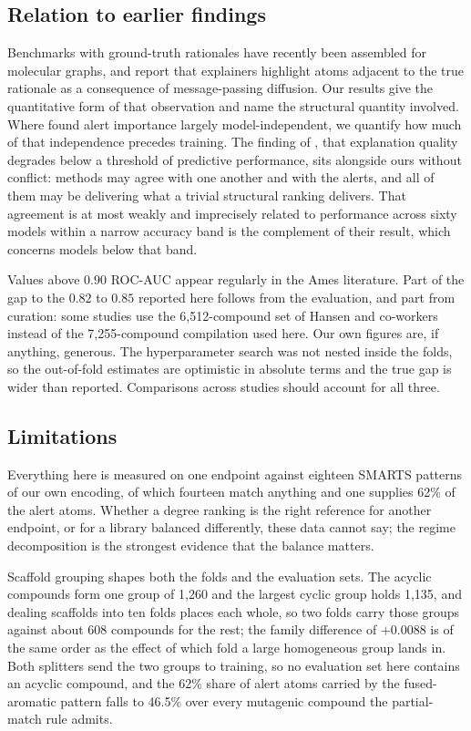 \documentclass[journal=jcisd8,manuscript=article]{achemso}
\begin{document}
\subsection{Relation to earlier findings}

Benchmarks with ground-truth rationales have recently been assembled for molecular graphs,
and report that explainers highlight atoms adjacent to the true rationale as a consequence of
message-passing diffusion.\cite{proszewska2025} Our results give the quantitative form of
that observation and name the structural quantity involved. Where \citet{hartog2024} found
alert importance largely model-independent, we quantify how much of that independence
precedes training. The finding of \citet{khasanova2026}, that explanation quality degrades
below a threshold of predictive performance, sits alongside ours without conflict: methods
may agree with one another and with the alerts, and all of them may be delivering what a
trivial structural ranking delivers. That agreement is at most weakly and imprecisely related to performance across
sixty models within a narrow accuracy band is the complement of their result, which concerns
models below that band.

Values above $0.90$ ROC-AUC appear regularly in the Ames literature. Part of the gap to the
$0.82$ to $0.85$ reported here follows from the evaluation, and part from curation: some
studies use the 6,512-compound set of Hansen and co-workers\cite{hansen2009} instead of the 7,255-compound compilation used here. Our own figures are, if anything, generous. The hyperparameter search was not nested
inside the folds, so the out-of-fold estimates are
optimistic in absolute terms and the true gap is wider than reported. Comparisons across
studies should account for all three.

\subsection{Limitations}

Everything here is measured on one endpoint against eighteen SMARTS patterns of our own
encoding, of which fourteen match anything and one supplies 62\% of the alert atoms. Whether
a degree ranking is the right reference for another endpoint, or for a library balanced
differently, these data cannot say; the regime decomposition is the strongest evidence that
the balance matters.

Scaffold grouping shapes both the folds and the evaluation sets. The acyclic compounds form
one group of 1,260 and the largest cyclic group holds 1,135, and dealing scaffolds into ten
folds places each whole, so two folds carry those groups against about 608 compounds for the
rest; the family difference of $+0.0088$ is of the same order as the effect of which fold a
large homogeneous group lands in. Both splitters send the two groups to training, so no
evaluation set here contains an acyclic compound, and the 62\% share of alert atoms carried
by the fused-aromatic pattern falls to 46.5\% over every mutagenic compound the
partial-match rule admits.
\end{document}
